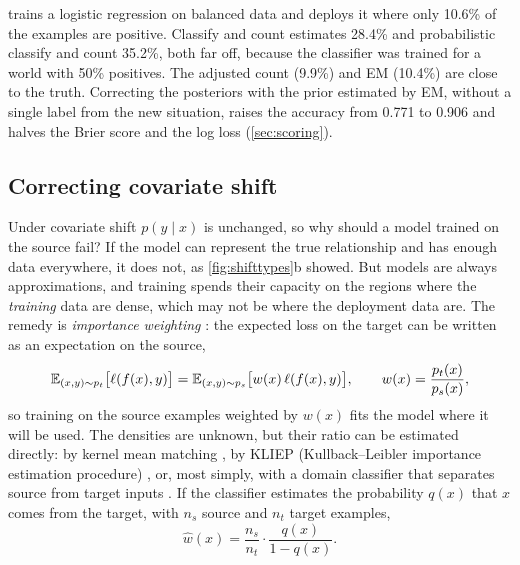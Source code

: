  trains a logistic regression on balanced data and deploys it where only 10.6\% of the examples
are positive. Classify and count estimates 28.4\% and probabilistic classify and count 35.2\%, both far off, because
the classifier was trained for a world with 50\% positives. The adjusted count (9.9\%) and EM (10.4\%) are close to the
truth. Correcting the posteriors with the prior estimated by EM, without a single label from the new situation, raises
the accuracy from 0.771 to 0.906 and halves the Brier score and the log loss (\cref{sec:scoring}).

\subsection{Correcting covariate shift}

Under covariate shift $p(y\mid x)$ is unchanged, so why should a model trained on the source fail? If the model can
represent the true relationship and has enough data everywhere, it does not, as \cref{fig:shifttypes}b showed. But
models are always approximations, and training spends their capacity on the regions where the \emph{training} data are
dense, which may not be where the deployment data are. The remedy is \emph{importance weighting}
\citep{shimodaira2000improving}: the expected loss on the target can be written as an expectation on the source,
\begin{equation}
  \mathbb{E}_{(x,y)\sim p_t}\bigl[\ell(f(x),y)\bigr]=\mathbb{E}_{(x,y)\sim p_s}\bigl[w(x)\,\ell(f(x),y)\bigr],\qquad
  w(x)=\frac{p_t(x)}{p_s(x)},
\end{equation}
so training on the source examples weighted by $w(x)$ fits the model where it will be used. The densities are unknown,
but their ratio can be estimated directly: by kernel mean matching \citep{huang2007correcting}, by KLIEP
(Kullback--Leibler importance estimation procedure) \citep{sugiyama2008direct}, or, most simply, with a domain classifier that separates source from target inputs
\citep{bickel2009discriminative}. If the classifier estimates the probability $q(x)$ that $x$ comes from the target, with $n_s$ source
and $n_t$ target examples,
\begin{equation}
  \hat w(x)=\frac{n_s}{n_t}\cdot\frac{q(x)}{1-q(x)} .
\end{equation}

